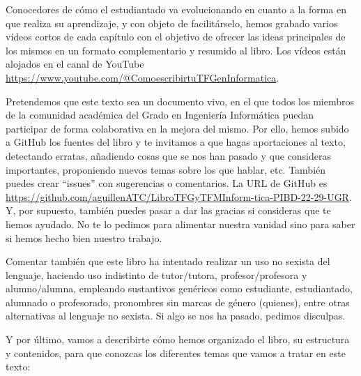 Conocedores de cómo el estudiantado va evolucionando en cuanto a la forma en que realiza su aprendizaje, y con objeto de facilitárselo, hemos grabado varios vídeos cortos de cada capítulo con el objetivo de ofrecer las ideas principales de los mismos en un formato complementario y resumido al libro. Los vídeos están alojados en el canal de YouTube \url{https://www.youtube.com/@ComoescribirtuTFGenInformatica}.

Pretendemos que este texto sea un documento vivo, en el que todos los miembros de la comunidad académica del Grado en Ingeniería Informática puedan participar de forma colaborativa en la mejora del mismo. Por ello, hemos subido a GitHub los fuentes del libro y te invitamos a que hagas aportaciones al texto, detectando erratas, añadiendo cosas que se nos han pasado y que consideras importantes, proponiendo nuevos temas sobre los que hablar, etc. También puedes crear ``issues'' con sugerencias o comentarios. La URL de GitHub es \url{https://github.com/aguillenATC/LibroTFGyTFMInform-tica-PIBD-22-29-UGR}. Y, por supuesto, también puedes pasar a dar las gracias si consideras que te hemos ayudado. No te lo pedimos para alimentar nuestra vanidad sino para saber si hemos hecho bien nuestro trabajo.

Comentar también que este libro ha intentado realizar un uso no sexista del lenguaje, haciendo uso indistinto de tutor/tutora, profesor/profesora y alumno/alumna, empleando sustantivos genéricos como estudiante, estudiantado, alumnado o profesorado, pronombres sin marcas de género (quienes), entre otras alternativas al lenguaje no sexista. Si algo se nos ha pasado, pedimos disculpas.

Y por último, vamos a describirte cómo hemos organizado el libro, su estructura y contenidos, para que conozcas los diferentes temas que vamos a tratar en este texto:

